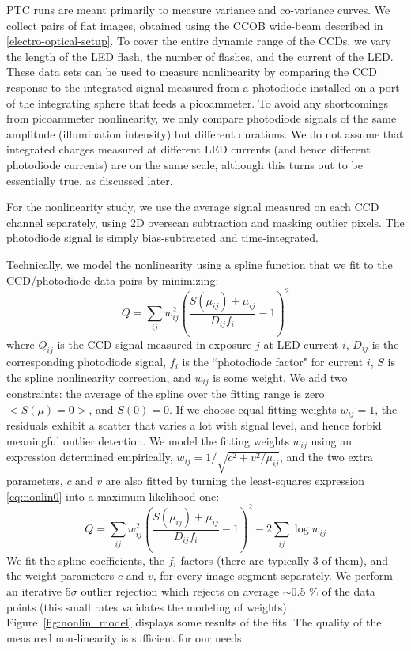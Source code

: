 PTC runs are meant primarily to measure variance and co-variance curves. We collect pairs of flat images, obtained using the CCOB wide-beam described in \ref{electro-optical-setup}. To cover the entire dynamic range of the CCDs, we vary the length of the LED flash, the number of flashes, and the current of the LED. These data sets can be used to measure nonlinearity by comparing the CCD response to the integrated signal measured from a photodiode installed on a port of the integrating sphere that feeds a picoammeter. To avoid any shortcomings from picoammeter nonlinearity, we only compare photodiode signals of the same amplitude (illumination intensity) but different durations. We do not assume that integrated charges measured at different LED currents (and hence different photodiode currents) are on the same scale, although this turns out to be essentially true, as discussed later. 

For the nonlinearity study, we use the average signal measured on each CCD channel separately, using 2D overscan subtraction and masking outlier pixels. The photodiode signal is simply bias-subtracted and time-integrated. 

Technically, we model the nonlinearity using a spline function that we fit to the CCD/photodiode data pairs by minimizing:
\begin{equation}
Q = \sum_{ij} w_{ij}^2 \left( \frac{ S(\mu_{ij}) +\mu_{ij}  }{D_{ij} f_i} -1 \right)^2
\label{eq:nonlin0}
\end{equation}
where $Q_{ij}$ is the CCD signal measured in exposure $j$ at LED current $i$,
$D_{ij}$ is the corresponding photodiode signal, $f_i$ is the ``photodiode factor" for current $i$, $S$ is the spline nonlinearity correction, and $w_{ij}$ is some weight. We add two constraints: the average of the spline over the fitting range is zero $<S(\mu)=0>$, and $S(0) = 0$. If we choose equal fitting weights $w_{ij}=1$, the residuals exhibit a scatter that varies a lot with signal level, and hence forbid meaningful outlier detection. We model the fitting weights $w_{ij}$ using an expression determined empirically, $w_{ij} = 1/\sqrt{c^2+v^2/\mu_{ij}}$, and the two extra parameters, $c$ and $v$ are also fitted by turning the least-squares expression \ref{eq:nonlin0} into a maximum likelihood one:
\begin{equation}
Q = \sum_{ij} w_{ij}^2 \left( \frac{ S(\mu_{ij}) +\mu_{ij}  }{D_{ij} f_i} -1 \right)^2 - 2 \sum_{ij} \log w_{ij}
\label{eq:nonlin1}
\end{equation}
We fit the spline coefficients, the $f_i$ factors (there are typically 3 of them), and the weight parameters $c$ and $v$, for every image segment separately. We perform an iterative 5$\sigma$ outlier rejection which rejects on average $\sim $0.5 \% of the data points (this small rates validates the modeling of weights). Figure~\ref{fig:nonlin_model} displays some results of the fits. The quality of the measured non-linearity is sufficient for our needs.   





